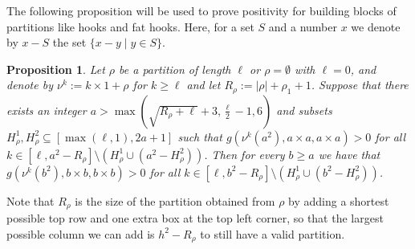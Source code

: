 \documentclass{article}
\numberwithin{equation}{section}
\newtheorem{proposition}[equation]{Proposition}
\theoremstyle{definition}
\begin{document}
The following proposition will be used to prove positivity for building blocks of partitions like hooks and fat hooks. Here, for a set $S$ and a number $x$ we denote by $x - S$ the set $\{ x-y \mid y \in S\}$. 



\begin{proposition}\label{prop:extensions}
Let $\rho$ be a partition of length $\ell$ or $\rho=\emptyset$ with $\ell=0$, and denote by $\nu^k := k \times 1 + \rho$ for $k\geq \ell$ and let $R_\rho := |\rho|+\rho_1+1$.
Suppose that there exists an integer $a  >  \max( \sqrt{R_\rho+\ell}+3,\frac{\ell}{2}-1,6)$
and subsets $H^1_\rho, H^2_\rho \subseteq [\max(\ell,1), 2a+1]$
such that
$g( \nu^k(a^2), a \times a, a \times a)>0$ for all $k \in [\ell , a^2 - R_\rho ] \setminus  \left( H^1_{\rho} \cup (a^2 - H^2_\rho) \right)$.
Then for every $b \geq a$ we have that
$g(\nu^k(b^2), b \times b, b \times b)>0$ for all  $k \in [\ell , b^2 - R_\rho ] \setminus \left( H^1_{\rho} \cup (b^2 - H^2_\rho) \right) $.
\end{proposition}
Note that $R_\rho$ is the size of the partition obtained from $\rho$ by adding a shortest possible top row and one extra box at the top left corner, so that the largest possible column we can add is $h^2 - R_\rho$ to still have a valid partition. 
\end{document}
